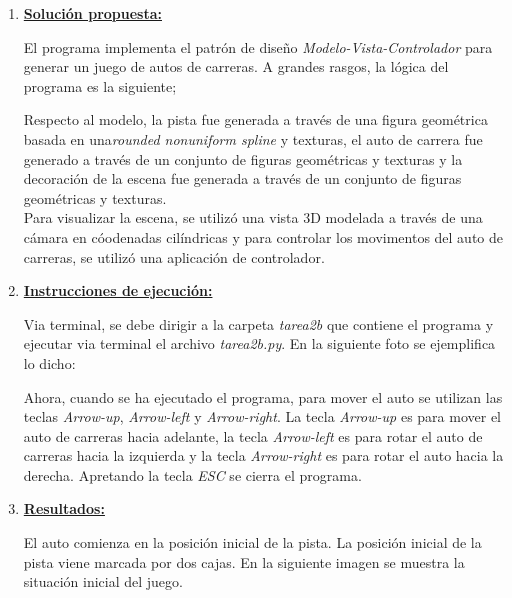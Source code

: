 \documentclass[letterpaper,11pt,oneside]{article}
\begin{document}
	





\begin{enumerate}
    \item \textbf{\underline{Solución propuesta:}} 

        El programa implementa el patrón de diseño \textit{Modelo-Vista-Controlador} para generar un juego de autos de carreras. A grandes rasgos, la lógica del programa es la siguiente;

        Respecto al modelo, la pista fue generada a través de una figura geométrica basada en una\textit{rounded nonuniform spline} y texturas, el auto de carrera fue generado a través de un conjunto de figuras geométricas y texturas y la decoración de la escena fue generada a través de un conjunto de figuras geométricas y texturas.\\

        Para visualizar la escena, se utilizó una vista 3D modelada a través de una cámara en cóodenadas cilíndricas y para controlar los movimentos del auto de carreras, se utilizó una aplicación de controlador.

    \item \textbf{\underline{Instrucciones de ejecución:}} 

        Via terminal, se debe dirigir a la carpeta \textit{tarea2b} que contiene el programa y ejecutar via terminal el archivo \textit{tarea2b.py}. En la siguiente foto se ejemplifica lo dicho: 


        Ahora, cuando se ha ejecutado el programa, para mover el auto se utilizan las teclas \textit{Arrow-up}, \textit{Arrow-left} y \textit{Arrow-right}. La tecla \textit{Arrow-up} es para mover el auto de carreras hacia adelante, la tecla \textit{Arrow-left} es para rotar el auto de carreras hacia la izquierda y la tecla \textit{Arrow-right} es para rotar el auto hacia la derecha. Apretando la tecla \textit{ESC} se cierra el programa.
    \item \textbf{\underline{Resultados:}} 

        El auto comienza en la posición inicial de la pista. La posición inicial de la pista viene marcada por dos cajas. En la siguiente imagen se muestra la situación inicial del juego.



\end{enumerate}
\end{document}
